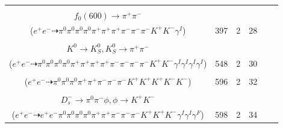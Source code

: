 \documentclass[landscape]{article}
\newcounter{rownumbers}
\newcommand\rn{\stepcounter{rownumbers}\arabic{rownumbers}}
\newcommand{\EOLP}{\\ \hline} %
\newcommand{\topoTags}[1]{#1} %
\begin{document}
\begin{longtable}{clcccc}
\rn & \makecell[l]{ $ 
e^{+} e^{-} \rightarrow K^{+} D^{*0} D_{s}^{-} \gamma^{I} ,
D^{*0} \rightarrow \pi^{0} D^{0} ,
D_{s}^{-} \rightarrow \pi^{0} \pi^{0} \pi^{-} \omega ,
D^{0} \rightarrow K^{-} a_{1}^{+} ,
\omega \rightarrow \pi^{0} \pi^{+} \pi^{-} ,
a_{1}^{+} \rightarrow \pi^{+} f_{0}(600) ,
$ \\ $
f_{0}(600) \rightarrow \pi^{+} \pi^{-} 
$ \\ ($
e^{+} e^{-} \dashrightarrow \pi^{0} \pi^{0} \pi^{0} \pi^{0} \pi^{+} \pi^{+} \pi^{+} \pi^{-} \pi^{-} \pi^{-} K^{+} K^{-} \gamma^{I} 
$) } & \topoTags{397 & }2 & 28 \EOLP

\rn & \makecell[l]{ $ 
e^{+} e^{-} \rightarrow \pi^{+} \eta K^{-} D^{*-} D_{s}^{+} \gamma^{I} \gamma^{I} \gamma^{I} \gamma^{I} ,
\eta \rightarrow \pi^{0} \pi^{+} \pi^{-} ,
D^{*-} \rightarrow \pi^{-} \bar{D}^{0} ,
D_{s}^{+} \rightarrow \pi^{0} \pi^{+} K^{*} ,
\bar{D}^{0} \rightarrow \pi^{0} \pi^{-} K^{+} ,
K^{*} \rightarrow \pi^{0} K^{0} ,
$ \\ $
K^{0} \rightarrow K_{S}^{0} ,
K_{S}^{0} \rightarrow \pi^{+} \pi^{-} 
$ \\ ($
e^{+} e^{-} \dashrightarrow \pi^{0} \pi^{0} \pi^{0} \pi^{0} \pi^{+} \pi^{+} \pi^{+} \pi^{+} \pi^{-} \pi^{-} \pi^{-} \pi^{-} K^{+} K^{-} \gamma^{I} \gamma^{I} \gamma^{I} \gamma^{I} 
$) } & \topoTags{548 & }2 & 30 \EOLP

\rn & \makecell[l]{ $ 
e^{+} e^{-} \rightarrow \pi^{-} K^{+} K^{+} K^{-} D^{*+} D_{s}^{*-} ,
D^{*+} \rightarrow \pi^{0} D^{+} ,
D_{s}^{*-} \rightarrow \pi^{0} D_{s}^{-} ,
D^{+} \rightarrow \pi^{0} \pi^{+} K_{S}^{0} ,
D_{s}^{-} \rightarrow \pi^{-} K^{+} K^{-} ,
K_{S}^{0} \rightarrow \pi^{+} \pi^{-} 
$ \\ ($
e^{+} e^{-} \dashrightarrow \pi^{0} \pi^{0} \pi^{0} \pi^{+} \pi^{+} \pi^{-} \pi^{-} \pi^{-} K^{+} K^{+} K^{+} K^{-} K^{-} 
$) } & \topoTags{596 & }2 & 32 \EOLP

\rn & \makecell[l]{ $ 
e^{+} e^{-} \rightarrow \omega K^{+} D^{*0} D_{s}^{*-} \gamma^{I} \gamma^{I} ,
\omega \rightarrow \pi^{0} \pi^{+} \pi^{-} ,
D^{*0} \rightarrow \pi^{0} D^{0} ,
D_{s}^{*-} \rightarrow \pi^{0} D_{s}^{-} ,
\pi^{0} \rightarrow e^{+} e^{-} \gamma^{F} ,
D^{0} \rightarrow \pi^{0} \pi^{+} \pi^{-} ,
$ \\ $
D_{s}^{-} \rightarrow \pi^{0} \pi^{-} \phi ,
\phi \rightarrow K^{+} K^{-} 
$ \\ ($
e^{+} e^{-} \dashrightarrow e^{+} e^{-} \pi^{0} \pi^{0} \pi^{0} \pi^{0} \pi^{+} \pi^{+} \pi^{-} \pi^{-} \pi^{-} K^{+} K^{+} K^{-} \gamma^{I} \gamma^{I} \gamma^{F} 
$) } & \topoTags{598 & }2 & 34 \EOLP


\end{longtable}
\end{document}
